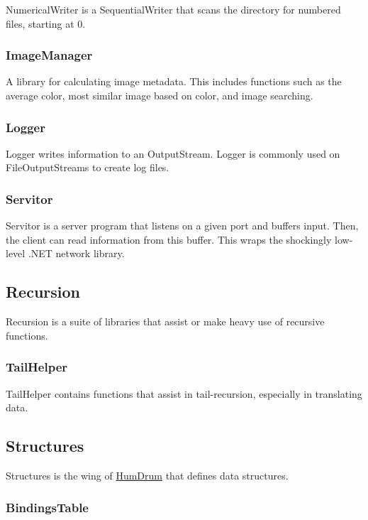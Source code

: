 Numerical\+Writer is a Sequential\+Writer that scans the directory for numbered files, starting at 0.

\subsubsection*{Image\+Manager}

A library for calculating image metadata. This includes functions such as the average color, most similar image based on color, and image searching.

\subsubsection*{Logger}

Logger writes information to an Output\+Stream. Logger is commonly used on File\+Output\+Streams to create log files.

\subsubsection*{Servitor}

Servitor is a server program that listens on a given port and buffers input. Then, the client can read information from this buffer. This wraps the shockingly low-\/level .N\+E\+T network library.

\subsection*{Recursion}

Recursion is a suite of libraries that assist or make heavy use of recursive functions.

\subsubsection*{Tail\+Helper}

Tail\+Helper contains functions that assist in tail-\/recursion, especially in translating data.

\subsection*{Structures}

Structures is the wing of \hyperlink{namespaceHumDrum}{Hum\+Drum} that defines data structures.

\subsubsection*{Bindings\+Table}

